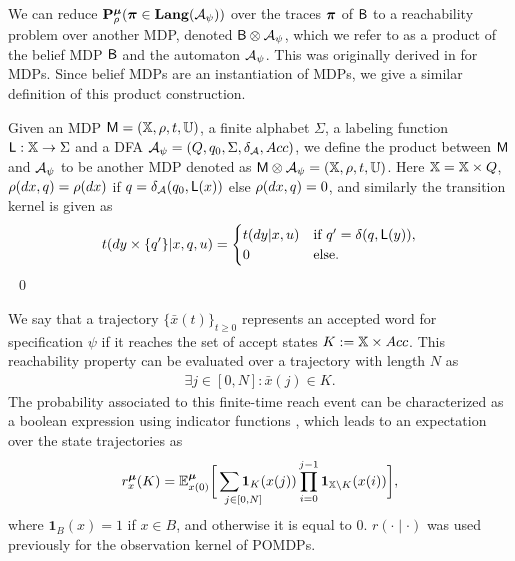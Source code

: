 \documentclass{ifacconf}
\newcommand{\red}[1]{{\color{red} #1}}
\newcommand{\new}[1]{{\color{blue}#1}}
\newcommand{\ind}{\mathbf{1}}
\newcommand{\cristi}[1]{{\color{orange}#1}}
\begin{document}
We can
reduce $\mathbf{P}_\rho^{\boldsymbol{\mu}}
({\boldsymbol{\pi}} \in\mathbf{Lang} (\mathcal{A}_\psi))$ over the traces ${\boldsymbol{\pi}}$ of $\mathsf{B}$ to a reachability problem
 over another MDP,  denoted  $\mathsf{B}\otimes\mathcal{A}_\psi$, which we refer to as a product of the belief MDP $\mathsf{B}$ and the automaton $\mathcal{A}_\psi$. This was originally derived in \citep{tmka2013} for MDPs. Since belief MDPs are an instantiation of MDPs, we give a similar definition of this product construction.
%
\begin{definition}
\label{def:product}
Given an MDP  $\mathsf{M} = ({\mathbb{X}}, \rho, t, {\mathbb{U}})$,
a finite alphabet $\Sigma$,
a labeling function $\mathsf{L}:{\mathbb{X}}\rightarrow\Sigma$
and a DFA  $\mathcal{A}_\psi = (Q, q_0, \Sigma, \delta_{\mathcal{A}}, Acc)$,
we define the product between $\mathsf{M}$ and $\mathcal{A}_\psi$ to be another MDP denoted as
$\mathsf{M}\otimes\mathcal{A}_\psi = (\relax {\mathbb{X}}, \relax\rho,\relax{t},{\mathbb{U}})$.
Here $\relax {\mathbb{X}}= {\mathbb{X}}\times Q$, $\relax\rho(dx,q) = \rho(dx)$ if $q= \delta_{\mathcal{A}}(q_0,\mathsf L(x))$ else $ \relax\rho(dx,q) =0$, and similarly the transition kernel is given as  
\begin{equation*}
  \relax{t}(d y\times\{q'\}|x,q,u) = \begin{cases}t(dy|x,u)& \text{if } q' =\delta(q,\mathsf{L}(y)),\\ 0 & \text{else.}  \end{cases}
\end{equation*} 
\hfill \mbox{ }\qed
\end{definition}


\new{
We say that a trajectory $
\{\bar x(t)\}_{t\geq 0}$  represents an accepted word for specification $\psi$ if it reaches the set of accept states $K:={\mathbb{X}}\times Acc$.
This reachability property can be evaluated over a   trajectory with length $N$ as 
\begin{align*}\textstyle
\exists j \in [0,N]: \bar x(j) \in K.\end{align*}
The probability associated to this finite-time reach  event can be characterized as a boolean expression using indicator functions \cite{Abate1},
which leads to 
an expectation over the state trajectories as 
\begin{align*} 
r_{\bar x }^\polb(K)=\mathbb{E}_{\bar x(0)}^{\bar \polb}\bigg[\sum\limits_{\mathclap{\qquad j\in[0,N]}}\ind_{K}(\bar x(j))\prod_{i=0}^{j-1}\ind_{\bar{\X}\setminus K}(\bar x(i))\bigg],
\end{align*} 
where $\ind_{B}(x) = 1$ if $x \in B$, 
and otherwise it is equal to $0$.  }
\cristi{$r(\cdot \mid \cdot)$ was used previously for the observation kernel of POMDPs.}
\end{document}
